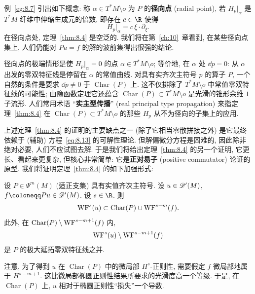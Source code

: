 例~\ref{eg:8.7} 引出如下概念: 称 $\alpha \in T^*M \setminus o$ 为 $P$ 的\textbf{径向点} (radial point), 若 $H_p|_\alpha$ 是 $T^*M$ 纤维中伸缩生成元的倍数, 即存在 $c \in \R$ 使得
\begin{equation}\label{eq:8.17}
    H_p|_\alpha = c\,\xi \cdot \partial_\xi.
\end{equation}
在径向点处, 定理~\ref{thm:8.4} 是空泛的. 我们将在第~\ref{ch:10}~章看到, 在某些径向点集上, 人们仍能对 $Pu = f$ 的解的波前集得出很强的结论.

径向点的极端情形是使 $H_p|_\alpha = 0$ 的点 $\alpha \in T^*M \setminus o$; 等价地, 在 $\alpha$ 处 $\dd p = 0$: 从 $\alpha$ 出发的零双特征线是停留在 $\alpha$ 的常值曲线. 对具有实齐次主符号 $p$ 的算子 $P$, 一个自然的条件是要求 $\dd p \neq 0$ 于 $\operatorname{Char}(P)$ 上. 这不仅排除了 $T^*M \setminus o$ 中常值零双特征线的可能性; 由隐函数定理它还蕴含 $\operatorname{Char}(P) \subset T^*M \setminus o$ 是光滑的锥形余维 $1$ 子流形. 人们常用术语 ``\textbf{实主型传播}'' (real principal type propagation) 来指定理~\ref{thm:8.4} 在 $\operatorname{Char}(P) \subset T^*M \setminus o$ 的那些 $H_p$ 从不为径向的子集上的应用.

上述定理~\ref{thm:8.4} 的证明的主要缺点之一 (除了它相当零散拼接之外) 是它最终依赖于 (辅助) 方程~\eqref{eq:8.13} 的可解性理论. 但解偏微分方程是困难的, 因此除非绝对必要, 人们不应试图去解. 于是我们将给出定理~\ref{thm:8.4} 的另一个证明, 它更长、看起来更复杂, 但核心非常简单: 它是\textbf{正对易子} (positive commutator) 论证的原型. 我们将证明定理~\ref{thm:8.4} 的如下加强形式:

\begin{theorem}\label{thm:8.8}
设 $P \in \Psi^m(M)$ (适正支集) 具有实值齐次主符号. 设 $u \in \mathscr{D}'(M)$, $f \defeq Pu \in \Distr(M)$. 设 $s \in \R$. 则
\begin{equation}\label{eq:8.18}
    \operatorname{WF}^s(u) \subset \operatorname{Char}(P) \cup \operatorname{WF}^{s-m}(f).
\end{equation}
此外, 在 $\operatorname{Char}(P) \setminus \operatorname{WF}^{s-m+1}(f)$ 内,
\begin{equation}\label{eq:8.19}
    \operatorname{WF}^s(u) \setminus \operatorname{WF}^{s-m+1}(f)
\end{equation}
是 $P$ 的极大延拓零双特征线之并.
\end{theorem}

\begin{remark}[``损失'' 一个导数]\label{rem:8.9}
注意, 为了得到 $u$ 在 $\operatorname{Char}(P)$ 中的微局部 $H^s$-正则性, 需要假定 $f$ 微局部地属于 $H^{s-m+1}$. 这比微局部椭圆正则性结果所要求的光滑度高一个等级. 于是, 在 $\operatorname{Char}(P)$ 上, $u$ 相对于椭圆正则性``损失''一个导数.
\end{remark}


